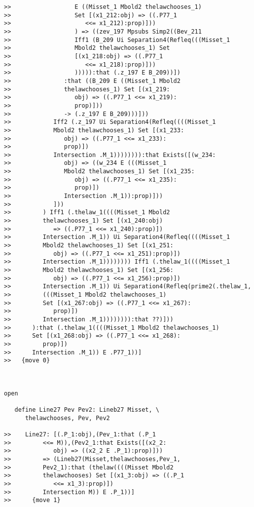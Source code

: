 \documentclass[12pt]{article}
\begin{document}
\begin{verbatim}
>>                  E ((Misset_1 Mbold2 thelawchooses_1)
>>                  Set [(x1_212:obj) => ((.P77_1
>>                     <<= x1_212):prop)]))
>>                  ) => ((zev_197 Mpsubs Simp2((Bev_211
>>                  Iff1 (B_209 Ui Separation4(Refleq(((Misset_1
>>                  Mbold2 thelawchooses_1) Set
>>                  [(x1_218:obj) => ((.P77_1
>>                     <<= x1_218):prop)]))
>>                  ))))):that (.z_197 E B_209))])
>>               :that ((B_209 E ((Misset_1 Mbold2
>>               thelawchooses_1) Set [(x1_219:
>>                  obj) => ((.P77_1 <<= x1_219):
>>                  prop)]))
>>               -> (.z_197 E B_209)))]))
>>            Iff2 (.z_197 Ui Separation4(Refleq((((Misset_1
>>            Mbold2 thelawchooses_1) Set [(x1_233:
>>               obj) => ((.P77_1 <<= x1_233):
>>               prop)])
>>            Intersection .M_1)))))))):that Exists([(w_234:
>>               obj) => ((w_234 E (((Misset_1
>>               Mbold2 thelawchooses_1) Set [(x1_235:
>>                  obj) => ((.P77_1 <<= x1_235):
>>                  prop)])
>>               Intersection .M_1)):prop)]))
>>            ]))
>>         ) Iff1 (.thelaw_1((((Misset_1 Mbold2
>>         thelawchooses_1) Set [(x1_240:obj)
>>            => ((.P77_1 <<= x1_240):prop)])
>>         Intersection .M_1)) Ui Separation4(Refleq((((Misset_1
>>         Mbold2 thelawchooses_1) Set [(x1_251:
>>            obj) => ((.P77_1 <<= x1_251):prop)])
>>         Intersection .M_1)))))))) Iff1 (.thelaw_1((((Misset_1
>>         Mbold2 thelawchooses_1) Set [(x1_256:
>>            obj) => ((.P77_1 <<= x1_256):prop)])
>>         Intersection .M_1)) Ui Separation4(Refleq(prime2(.thelaw_1,
>>         (((Misset_1 Mbold2 thelawchooses_1)
>>         Set [(x1_267:obj) => ((.P77_1 <<= x1_267):
>>            prop)])
>>         Intersection .M_1)))))))):that ??)]))
>>      ):that (.thelaw_1((((Misset_1 Mbold2 thelawchooses_1)
>>      Set [(x1_268:obj) => ((.P77_1 <<= x1_268):
>>         prop)])
>>      Intersection .M_1)) E .P77_1))]
>>   {move 0}



open

   define Line27 Pev Pev2: Lineb27 Misset, \
      thelawchooses, Pev, Pev2

>>    Line27: [(.P_1:obj),(Pev_1:that (.P_1
>>         <<= M)),(Pev2_1:that Exists([(x2_2:
>>            obj) => ((x2_2 E .P_1):prop)]))
>>         => (Lineb27(Misset,thelawchooses,Pev_1,
>>         Pev2_1):that (thelaw((((Misset Mbold2
>>         thelawchooses) Set [(x1_3:obj) => ((.P_1
>>            <<= x1_3):prop)])
>>         Intersection M)) E .P_1))]
>>      {move 1}




\end{verbatim}
\end{document}
